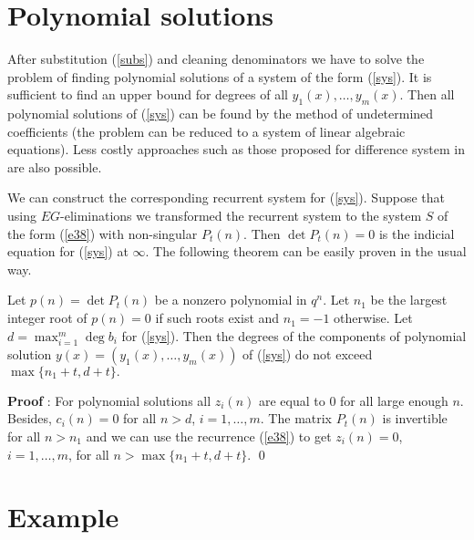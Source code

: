 \section{Polynomial solutions}
\label{psol}
After substitution (\ref{subs}) and
cleaning denominators we have to solve
the problem of finding polynomial solutions of a system of the form
(\ref{sys}). It is sufficient to find an upper bound for degrees
of all $y_1(x),\dots ,y_m(x)$. Then all polynomial solutions of
(\ref{sys}) can be found by the method of undetermined coefficients
(the problem can be reduced to a system of linear algebraic
equations). Less costly approaches such as those proposed
for difference system
in  \cite{AB98}
are also possible.

We can construct the corresponding recurrent system for (\ref{sys}).
Suppose that using $EG$-eliminations
we transformed the recurrent system to the  system $S$
of the form (\ref{e38}) with non-singular $P_t(n)$. Then $\det
P_t(n)=0$ is the indicial equation  for (\ref{sys}) at $\infty $.
The following theorem can be easily proven
in the usual way.
\begin{Theorem}
\label{l6}
Let $p(n)=\det P_t(n)$ be a nonzero polynomial in $q^n$.
Let $n_1$ be the largest integer root of $p(n)=0$ if
such roots exist and $n_1=-1$ otherwise. Let
$d=\max _{i=1}^m \deg b_i$ for (\ref{sys}).
Then the
degrees of
the components of polynomial solution $y(x)=(y_1(x),\dots ,
y_m(x))$  of (\ref{sys}) do not exceed
$ \max \{ n_1+t, d+t \} .$
\end{Theorem}
{\bf Proof \/}: For polynomial solutions all
$z_i(n)$ are equal to 0 for all large enough
$n$. Besides, $c_i(n)=0$ for
all $n>d$, $i=1,\dots ,m$. The matrix $P_t(n)$ is invertible
for all $n>n_1$ and we can use the recurrence (\ref{e38}) to
get $z_i(n)=0$, $i=1,\dots ,m$, for all
$n> \max \{ n_1+t, d+t \}$. \qed
\section{Example}


